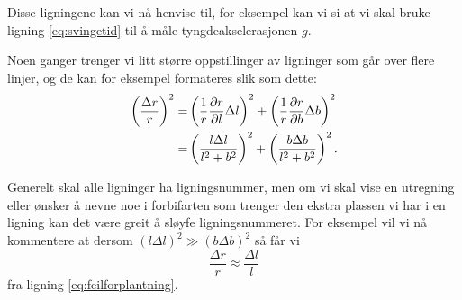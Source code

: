 Disse ligningene kan vi nå henvise til, for eksempel kan vi si at vi skal bruke ligning
\eqref{eq:svingetid} til å måle tyngdeakselerasjonen $g$.


Noen ganger trenger vi litt større oppstillinger av ligninger som går over flere linjer, og de kan for eksempel formateres slik som dette:
\begin{align}
\left(\frac{\Delta r}{r}\right)^2=&\left(\frac{1}{r}\frac{\partial r}{\partial l}\Delta l\right)^2+\left(\frac{1}{r}\frac{\partial r}{\partial b}\Delta b\right)^2 \notag \\
=&\left(\frac{l\Delta l}{l^2+b^2}\right)^2+\left(\frac{b\Delta b}{l^2+b^2}\right)^2.
\label{eq:feilforplantning}
\end{align}


Generelt skal alle ligninger ha ligningsnummer, men om vi skal vise en utregning eller ønsker å nevne noe i forbifarten som trenger den ekstra plassen vi har i en ligning kan det være greit å sløyfe ligningsnummeret. For eksempel vil vi nå kommentere at dersom $(l \Delta l)^2 \gg (b \Delta b)^2$ så får vi
\begin{equation*}
\frac{\Delta r}{r}\approx\frac{\Delta l}{l}
\end{equation*}
fra ligning \eqref{eq:feilforplantning}. 


